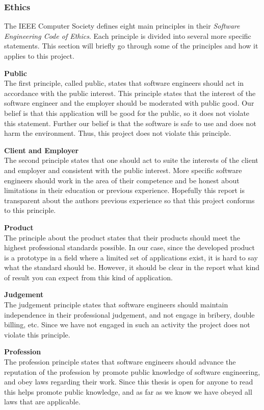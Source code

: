 \documentclass[12pt, a4paper, onecolumn]{article}
\newcommand{\parag}[1]{
	\textbf{#1} \hspace{0pt} \\
}
\begin{document}
	\subsubsection{Ethics}
	
	The IEEE Computer Society defines eight main principles in their \textit{Software Engineering Code of Ethics}. Each principle is divided into several more specific statements.
	This section will briefly go through some of the principles and how it applies to this project.
	
	\parag{Public}
	The first principle, called public, states that software engineers should act in accordance with the public interest. This principle states that the interest of the software engineer and the employer should be moderated with public good. Our belief is that this application will be good for the public, so it does not violate this statement. Further our belief is that the software is safe to use and does not harm the environment. Thus, this project does not violate this principle.
	
	\parag{Client and Employer}
	The second principle states that one should act to suite the interests of the client and employer and consistent with the public interest. More specific software engineers should work in the area of their competence and be honest about limitations in their education or previous experience. Hopefully this report is transparent about the authors previous experience so that this project conforms to this principle.
	
	\parag{Product}
	The principle about the product states that their products should meet the highest professional standards possible. In our case, since the developed product is a prototype in a field where a limited set of applications exist, it is hard to say what the standard should be. However, it should be clear in the report what kind of result you can expect from this kind of application.
	
	\parag{Judgement}
	The judgement principle states that software engineers should maintain independence in their professional judgement, and not engage in bribery, double billing, etc. Since we have not engaged in such an activity the project does not violate this principle.
	
	\parag{Profession}
	The profession principle states that software engineers should advance the reputation of the profession by promote public knowledge of software engineering, and obey laws regarding their work. Since this thesis is open for anyone to read this helps promote public knowledge, and as far as we know we have obeyed all laws that are applicable.
	
\end{document}
